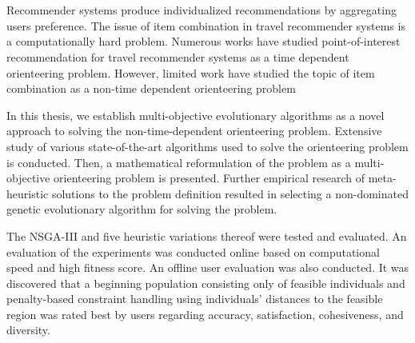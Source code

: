 \chapter{\abstractname}
Recommender systems produce individualized recommendations by aggregating users preference. The issue of item combination in travel recommender systems is a computationally hard problem. Numerous works have studied point-of-interest recommendation for travel recommender systems as a time dependent orienteering problem. However, limited work have studied the topic of item combination as a non-time dependent orienteering problem

In this thesis, we establish multi-objective evolutionary algorithms as a novel approach to solving the non-time-dependent orienteering problem. Extensive study of various state-of-the-art algorithms used to solve the orienteering problem is conducted. Then, a mathematical reformulation of the problem as a multi-objective orienteering problem is presented. Further empirical research of meta-heuristic solutions to the problem definition resulted in selecting a non-dominated genetic evolutionary algorithm for solving the problem. 

The NSGA-III and five heuristic variations thereof were tested and evaluated. An evaluation of the experiments was conducted online based on computational speed and high fitness score. An offline user evaluation was also conducted. It was discovered that a beginning population consisting only of feasible individuals and penalty-based constraint handling using individuals’ distances to the feasible region was rated best by users regarding accuracy, satisfaction, cohesiveness, and diversity.


\makeatletter
{}
{\renewcommand{\abstractname}{Kurzfassung}}
{\renewcommand{\abstractname}{Abstract}}
\makeatother

